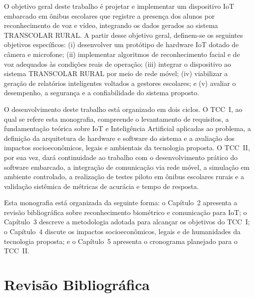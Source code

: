 \documentclass[
    12pt,
    openright,
    twoside,
    a4paper,
    chapter=TITLE,
    section=TITLE,
    english,
    brazil
    ]{abntex2}
\begin{document}
O objetivo geral deste trabalho é projetar e implementar um dispositivo IoT
embarcado em ônibus escolares que registre a presença dos alunos por
reconhecimento de voz e vídeo, integrando os dados gerados ao sistema
TRANSCOLAR RURAL. A partir desse objetivo geral, definem-se os seguintes
objetivos específicos: (i) desenvolver um protótipo de hardware IoT dotado de
câmera e microfone; (ii) implementar algoritmos de reconhecimento facial e de
voz adequados às condições reais de operação; (iii) integrar o dispositivo ao
sistema TRANSCOLAR RURAL por meio de rede móvel; (iv) viabilizar a geração de
relatórios inteligentes voltados a gestores escolares; e (v) avaliar o
desempenho, a segurança e a confiabilidade do sistema proposto.

O desenvolvimento deste trabalho está organizado em dois ciclos. O TCC~I, ao
qual se refere esta monografia, compreende o levantamento de requisitos, a
fundamentação teórica sobre IoT e Inteligência Artificial aplicadas ao
problema, a definição da arquitetura de hardware e software do sistema e a
avaliação dos impactos socioeconômicos, legais e ambientais da tecnologia
proposta. O TCC~II, por sua vez, dará continuidade ao trabalho com o
desenvolvimento prático do software embarcado, a integração de comunicação
via rede móvel, a simulação em ambiente controlado, a realização de testes
piloto em ônibus escolares rurais e a validação sistêmica de métricas de
acurácia e tempo de resposta.

Esta monografia está organizada da seguinte forma: o Capítulo~2 apresenta a
revisão bibliográfica sobre reconhecimento biométrico e comunicação para IoT;
o Capítulo~3 descreve a metodologia adotada para alcançar os objetivos do
TCC~I; o Capítulo~4 discute os impactos socioeconômicos, legais e de
humanidades da tecnologia proposta; e o Capítulo~5 apresenta o cronograma
planejado para o TCC~II.

\chapter{Revisão Bibliográfica}
\end{document}
